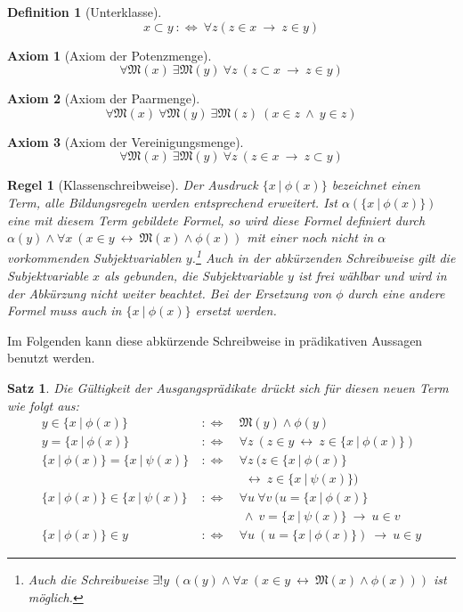 \documentclass[a4paper,german,10pt,twoside]{book}
\newtheorem{thm}{Satz}[section]
\newtheorem{ax}{Axiom}
\newtheorem{defn}{Definition}
\newtheorem{rul}{Regel}
\newcommand{\defp}{\ :\Leftrightarrow \ }
\newcommand{\impl}{\ \rightarrow \ }
\newcommand{\equi}{\ \leftrightarrow \ }
\newcommand{\conj}{\ \wedge \ }
\newcommand{\isSet}[1]{\mathfrak{M}(#1)}
\begin{document}
{\begin{defn}[Unterklasse]
$$ x \subset y \defp \forall z ( z \in x \impl z \in y)$$
\end{defn}

\begin{ax}[Axiom der Potenzmenge]
$$\forall \isSet{x} \ \exists \isSet{y} \ \forall z \ ( z \subset x \impl z \in y)$$
\end{ax}

\begin{ax}[Axiom der Paarmenge]
$$\forall \isSet{x} \ \forall \isSet{y} \ \exists \isSet{z} \ ( x \in z \conj y \in z)$$
\end{ax}

\begin{ax}[Axiom der Vereinigungsmenge]
$$\forall \isSet{x} \ \exists \isSet{y} \ \forall z \ ( z \in x \impl z \subset y)$$
\end{ax}

\begin{rul}[Klassenschreibweise]\label{classcomp}
Der Ausdruck $\{x~|~\phi(x) \}$ bezeichnet einen Term, alle Bildungsregeln werden entsprechend
erweitert. Ist $\alpha(\{ x~|~\phi(x) \})$ eine mit diesem Term gebildete Formel, so wird diese
Formel definiert durch $\alpha(y) \land \forall x \ (x \in y \equi \isSet{x} \land \phi(x))$ mit
einer noch nicht in $\alpha$ vorkommenden Subjektvariablen $y$.\footnote{Auch die Schreibweise
$\exists! y \ (\alpha(y) \land \forall x \ (x \in y \equi \isSet{x} \land \phi(x)))$ ist m{\"o}glich.}
Auch in der abk{\"u}rzenden Schreibweise gilt die Subjektvariable $x$ als gebunden, die Subjektvariable
$y$ ist frei w{\"a}hlbar und wird in der Abk{\"u}rzung nicht weiter beachtet. Bei der Ersetzung von $\phi$
durch eine andere Formel muss auch in $\{ x~|~\phi(x) \}$ ersetzt werden.
\end{rul}
Im Folgenden kann diese abk{\"u}rzende Schreibweise in pr{\"a}dikativen Aussagen benutzt werden.

\begin{thm}
Die G{\"u}ltigkeit der Ausgangspr{\"a}dikate dr{\"u}ckt sich f{\"u}r diesen neuen Term wie folgt aus:
\begin{eqnarray}
y \in \{ x~|~\phi(x) \} & \defp & \isSet{y} \land \phi(y) \label{inSetEqual} \\
y = \{ x~|~ \phi(x) \} & \defp & \forall z \ (z \in y \equi z \in \{ x~|~\phi(x) \}) \\
\{ x~|~\phi(x) \} = \{ x~|~\psi(x) \} & \defp & \forall z \ (z \in \{ x~|~\phi(x) \} \\
  & & \ \equi z \in \{x~|~\psi(x) \}) \\
\{ x~|~\phi(x) \} \in \{ x~|~\psi(x) \} & \defp & \forall u \ \forall
v \ (u	= \{ x~|~\phi(x) \} \nonumber \\
  & & \ \land \ v = \{ x~|~\psi(x) \} \impl u \in v \\
\{ x~|~\phi(x) \} \in y & \defp & \forall u \ (u  = \{ x~|~\phi(x) \})	\impl u \in y
\end{eqnarray}
\end{thm}

}
\end{document}

